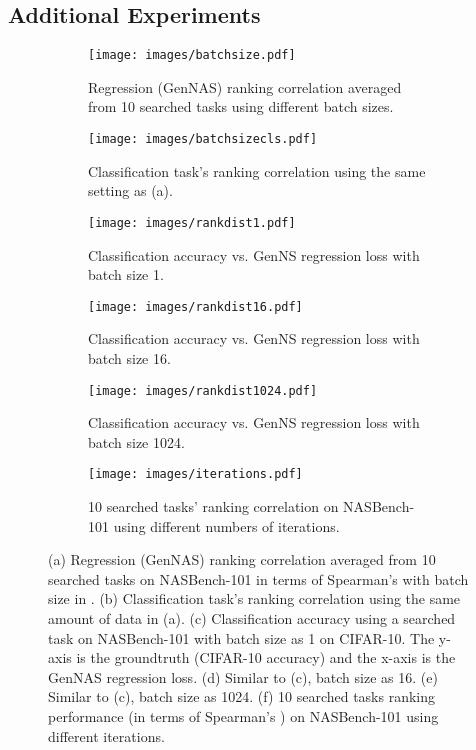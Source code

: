 \documentclass{article}
\begin{document}
\subsection{Additional Experiments}
\begin{figure}[t]
\vspace{-8pt}
     \centering
          \begin{subfigure}[b]{0.49\textwidth}
         \centering
         \texttt{[image: images/batchsize.pdf]}
         \caption{Regression (GenNAS) ranking correlation averaged from 10  searched tasks using different batch sizes.}
         \label{fig:bs}
     \end{subfigure}
     \hfill
     \begin{subfigure}[b]{0.49\textwidth}
         \centering
         \texttt{[image: images/batchsizecls.pdf]}
         \caption{Classification task's ranking correlation using the same setting as (a).}
         \label{fig:cls}
     \end{subfigure}
     \hfill
     \begin{subfigure}[b]{0.49\textwidth}
         \centering
         \texttt{[image: images/rankdist1.pdf]}
         \caption{Classification accuracy vs. GenNS regression loss with batch size 1.}
         \label{fig:dist1}
     \end{subfigure}
     \hfill
     \centering
     \begin{subfigure}[b]{0.49\textwidth}
         \centering
         \texttt{[image: images/rankdist16.pdf]}
         \caption{Classification accuracy vs. GenNS regression loss with batch size 16.}
         \label{fig:dist16}
     \end{subfigure}
     \hfill
     \begin{subfigure}[b]{0.49\textwidth}
         \centering
         \texttt{[image: images/rankdist1024.pdf]}
         \caption{Classification accuracy vs. GenNS regression loss with batch size 1024.}
         \label{fig:dist512}
     \end{subfigure}
     \hfill
     \begin{subfigure}[b]{0.49\textwidth}
         \centering
         \texttt{[image: images/iterations.pdf]}
         \caption{10 searched tasks' ranking correlation on NASBench-101 using different numbers of iterations.}
         \label{fig:iters}
     \end{subfigure}
      \hfill
     \hfill
        \caption{(a) Regression (GenNAS) ranking correlation averaged from 10 searched tasks on NASBench-101 in terms of Spearman's  with batch size in . (b) Classification task's ranking correlation using the same amount of data in (a). (c) Classification accuracy using a searched task on NASBench-101 with batch size as 1 on CIFAR-10. The y-axis is the groundtruth (CIFAR-10 accuracy) and the x-axis is the GenNAS regression loss. (d) Similar to (c), batch size as 16. (e) Similar to (c), batch size as 1024. (f) 10 searched tasks ranking performance (in terms of Spearman's ) on NASBench-101 using different iterations. }
        \label{fig:bs&iters}
        \vspace{-8pt}
\end{figure}
\end{document}
